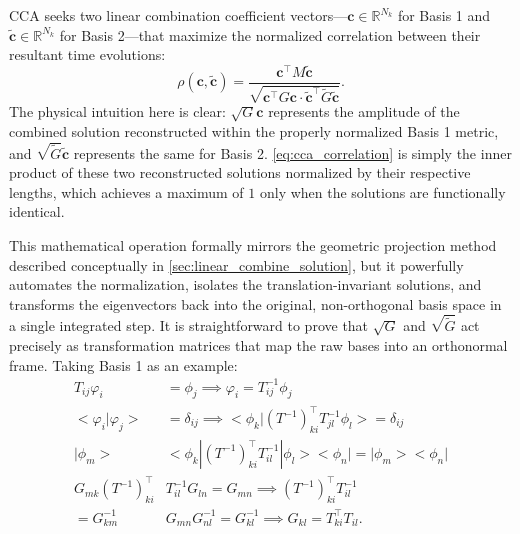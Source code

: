 \begin{subappendices}
CCA seeks two linear combination coefficient vectors—$\boldsymbol{c} \in \mathbb{R}^{N_k}$ for Basis 1 and $\boldsymbol{\tilde c} \in \mathbb{R}^{N_k}$ for Basis 2—that maximize the normalized correlation between their resultant time evolutions:
\begin{equation}\label{eq:cca_correlation}
\rho(\boldsymbol{c}, \boldsymbol{\tilde c}) = \frac{\boldsymbol{c}^\top M \boldsymbol{\tilde c}}{\sqrt{\boldsymbol{c}^\top G \boldsymbol{c} \cdot \boldsymbol{\tilde c}^\top \tilde G \boldsymbol{\tilde c}}}.
\end{equation}
The physical intuition here is clear: $\sqrt{G}\boldsymbol{c}$ represents the amplitude of the combined solution reconstructed within the properly normalized Basis 1 metric, and $\sqrt{\tilde G}\boldsymbol{\tilde c}$ represents the same for Basis 2. \cref{eq:cca_correlation} is simply the inner product of these two reconstructed solutions normalized by their respective lengths, which achieves a maximum of $1$ only when the solutions are functionally identical.

This mathematical operation formally mirrors the geometric projection method described conceptually in \cref{sec:linear_combine_solution}, but it powerfully automates the normalization, isolates the translation-invariant solutions, and transforms the eigenvectors back into the original, non-orthogonal basis space in a single integrated step. It is straightforward to prove that $\sqrt{G}$ and $\sqrt{\tilde G}$ act precisely as transformation matrices that map the raw bases into an orthonormal frame. Taking Basis 1 as an example: 
\begin{equation}
\begin{aligned}
    T_{ij}\varphi_i &=\phi_j  \implies  \varphi_i=T_{ij}^{-1}\phi_j\\
    \big< \varphi_i| \varphi_j\big>&=\delta_{ij}  \implies  \big< \phi_k|(T^{-1})^\top_{ki} T_{jl}^{-1}\phi_l\big>=\delta_{ij}\\
    |\phi_m\big>&\big< \phi_k|(T^{-1})^\top_{ki} T_{il}^{-1}|\phi_l\big>\big< \phi_n|=|\phi_m\big>\big< \phi_n|\\
    G_{mk}(T^{-1})^\top_{ki} &T_{il}^{-1}G_{ln}=G_{mn} \implies(T^{-1})^\top_{ki} T_{il}^{-1}\\
    =G_{km}^{-1} &G_{mn}G_{nl}^{-1}=G_{kl}^{-1}  \implies  G_{kl}=T^\top_{ki} T_{il}.
\end{aligned}
\end{equation}


\end{subappendices}
